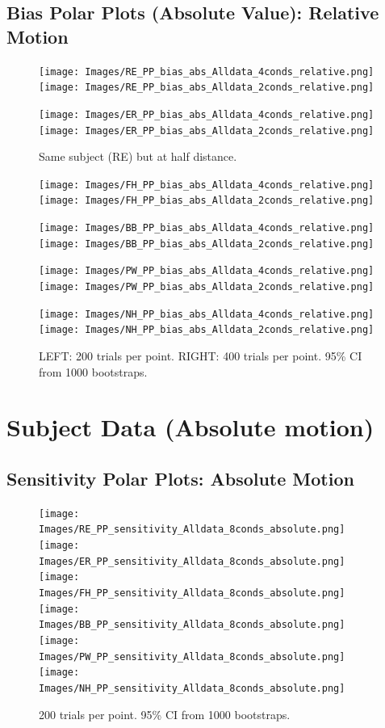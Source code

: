 \documentclass[11pt]{article} %
\begin{document}
\newpage
\subsection{Bias Polar Plots (Absolute Value): Relative Motion}
\begin{figure}[H]
\centering %
\texttt{[image: Images/RE\_PP\_bias\_abs\_Alldata\_4conds\_relative.png]}
\texttt{[image: Images/RE\_PP\_bias\_abs\_Alldata\_2conds\_relative.png]}
\end{figure}
\begin{figure}[H]
\centering %
\texttt{[image: Images/ER\_PP\_bias\_abs\_Alldata\_4conds\_relative.png]}
\texttt{[image: Images/ER\_PP\_bias\_abs\_Alldata\_2conds\_relative.png]}
\caption{Same subject (RE) but at half distance.}
\end{figure}
\begin{figure}[H]
\centering %
\texttt{[image: Images/FH\_PP\_bias\_abs\_Alldata\_4conds\_relative.png]}
\texttt{[image: Images/FH\_PP\_bias\_abs\_Alldata\_2conds\_relative.png]}
\end{figure}
\begin{figure}[H]
\centering %
\texttt{[image: Images/BB\_PP\_bias\_abs\_Alldata\_4conds\_relative.png]}
\texttt{[image: Images/BB\_PP\_bias\_abs\_Alldata\_2conds\_relative.png]}
\end{figure}
\begin{figure}[H]
\centering %
\texttt{[image: Images/PW\_PP\_bias\_abs\_Alldata\_4conds\_relative.png]}
\texttt{[image: Images/PW\_PP\_bias\_abs\_Alldata\_2conds\_relative.png]}
\end{figure}
\begin{figure}[H]
\centering %
\texttt{[image: Images/NH\_PP\_bias\_abs\_Alldata\_4conds\_relative.png]}
\texttt{[image: Images/NH\_PP\_bias\_abs\_Alldata\_2conds\_relative.png]}
\caption{LEFT: 200 trials per point. RIGHT: 400 trials per point. 95\% CI from 1000 bootstraps.}
\end{figure}

\newpage
\section{Subject Data (Absolute motion)}
\subsection{Sensitivity Polar Plots: Absolute Motion}
\begin{figure}[H]
\centering %
\texttt{[image: Images/RE\_PP\_sensitivity\_Alldata\_8conds\_absolute.png]}
\texttt{[image: Images/ER\_PP\_sensitivity\_Alldata\_8conds\_absolute.png]}
\texttt{[image: Images/FH\_PP\_sensitivity\_Alldata\_8conds\_absolute.png]}
\texttt{[image: Images/BB\_PP\_sensitivity\_Alldata\_8conds\_absolute.png]}
\texttt{[image: Images/PW\_PP\_sensitivity\_Alldata\_8conds\_absolute.png]}
\texttt{[image: Images/NH\_PP\_sensitivity\_Alldata\_8conds\_absolute.png]}
\caption{200 trials per point. 95\% CI from 1000 bootstraps.}
\end{figure}
\end{document}
